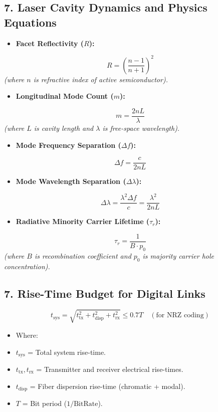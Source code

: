 \subsection{7. Laser Cavity Dynamics and Physics Equations}
\begin{itemize}
  \item   \textbf{Facet Reflectivity ($R$):}
\end{itemize}
    \[ R = \left( \frac{n - 1}{n + 1} \right)^2 \]
    \textit{(where $n$ is refractive index of active semiconductor).}
\begin{itemize}
  \item   \textbf{Longitudinal Mode Count ($m$):}
\end{itemize}
    \[ m = \frac{2nL}{\lambda} \]
    \textit{(where $L$ is cavity length and $\lambda$ is free-space wavelength).}
\begin{itemize}
  \item   \textbf{Mode Frequency Separation ($\Delta f$):}
\end{itemize}
    \[ \Delta f = \frac{c}{2nL} \]
\begin{itemize}
  \item   \textbf{Mode Wavelength Separation ($\Delta \lambda$):}
\end{itemize}
    \[ \Delta \lambda = \frac{\lambda^2 \Delta f}{c} = \frac{\lambda^2}{2nL} \]
\begin{itemize}
  \item   \textbf{Radiative Minority Carrier Lifetime ($\tau_r$):}
\end{itemize}
    \[ \tau_r = \frac{1}{B \cdot p_0} \]
    \textit{(where $B$ is recombination coefficient and $p_0$ is majority carrier hole concentration).}


\subsection{7. Rise-Time Budget for Digital Links}
\[ t_{\text{sys}} = \sqrt{t_{\text{tx}}^2 + t_{\text{disp}}^2 + t_{\text{rx}}^2} \le 0.7 T \quad (\text{for NRZ coding}) \]
\begin{itemize}
  \item   Where:
  \item   $t_{\text{sys}}$ = Total system rise-time.
  \item   $t_{\text{tx}}, t_{\text{rx}}$ = Transmitter and receiver electrical rise-times.
  \item   $t_{\text{disp}}$ = Fiber dispersion rise-time (chromatic + modal).
  \item   $T$ = Bit period ($1/\text{BitRate}$).
\end{itemize}

